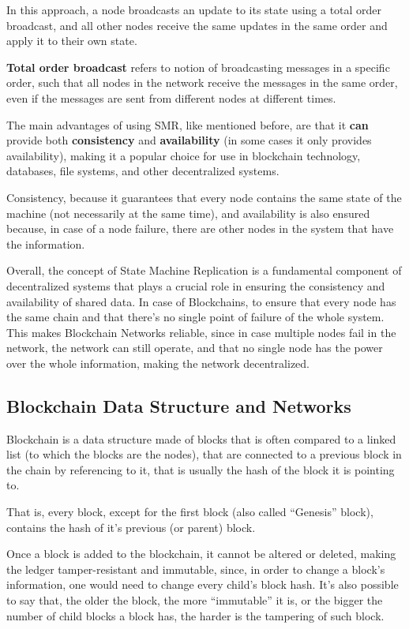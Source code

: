 In this approach, a node broadcasts an update to its state using a total order broadcast, and all other nodes receive the same updates in the same order and apply it to their own state.

\textbf{Total order broadcast} refers to notion of broadcasting messages in a specific order, such that all nodes in the network receive the messages in the same order, even if the messages are sent from different nodes at different times.

The main advantages of using SMR, like mentioned before, are that it \textbf{can} provide both \textbf{consistency} and \textbf{availability} (in some cases it only provides availability), making it a popular choice for use in blockchain technology, databases, file systems, and other decentralized systems.

Consistency, because it guarantees that every node contains the same state of the machine (not necessarily at the same time), and availability is also ensured because, in case of a node failure, there are other nodes in the system that have the information.

Overall, the concept of State Machine Replication is a fundamental component of decentralized systems that plays a crucial role in ensuring the consistency and availability of shared data. In case of Blockchains, to ensure that every node has the same chain and that there's no single point of failure of the whole system. This makes Blockchain Networks reliable, since in case multiple nodes fail in the network, the network can still operate, and that no single node has the power over the whole information, making the network decentralized. 


\subsection*{\textbf{Blockchain Data Structure and Networks}}
Blockchain is a data structure made of blocks that is often compared to a linked list (to which the blocks are the nodes), that are connected to a previous block in the chain by referencing to it, that is usually the hash of the block it is pointing to.

That is, every block, except for the first block (also called ``Genesis'' block), contains the hash of it's previous (or parent) block.

Once a block is added to the blockchain, it cannot be altered or deleted, making the ledger tamper-resistant and immutable, since, in order to change a block's information, one would need to change every child's block hash.
It's also possible to say that, the older the block, the more ``immutable'' it is, or the bigger the number of child blocks a block has, the harder is the tampering of such block.

